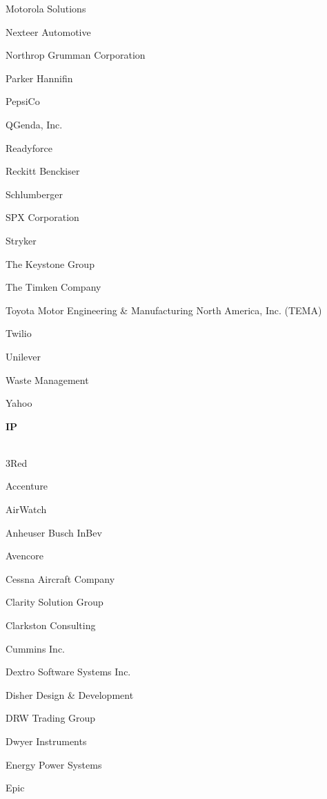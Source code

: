 \documentclass[twoside]{article}
\begin{document}
\begin{center}
\begin{multicols}{5}
\begin{FlushLeft}
\begin{compactitem}
\item Motorola Solutions
\item Nexteer Automotive
\item Northrop Grumman Corporation
\item Parker Hannifin
\item PepsiCo
\item QGenda, Inc.
\item Readyforce
\item Reckitt Benckiser
\item Schlumberger
\item SPX Corporation
\item Stryker
\item The Keystone Group
\item The Timken Company
\item Toyota Motor Engineering \& Manufacturing North America, Inc. (TEMA)
\item Twilio
\item Unilever
\item Waste Management
\item Yahoo
\end{compactitem}
        \end{FlushLeft}
        \vspace{1em}
        {\fontsize{14}{16}\selectfont \bf IP}\\
        \vspace{-1em}
        ~\hrulefill~
        \vspace{-.9em}
        \begin{FlushLeft}
        \begin{compactitem}
        \item 3Red
\item Accenture
\item AirWatch
\item Anheuser Busch InBev
\item Avencore
\item Cessna Aircraft Company
\item Clarity Solution Group
\item Clarkston Consulting
\item Cummins Inc.
\item Dextro Software Systems Inc.
\item Disher Design \& Development
\item DRW Trading Group
\item Dwyer Instruments
\item Energy Power Systems
\item Epic

\end{compactitem}
\end{FlushLeft}
\end{multicols}
\end{center}
\end{document}
